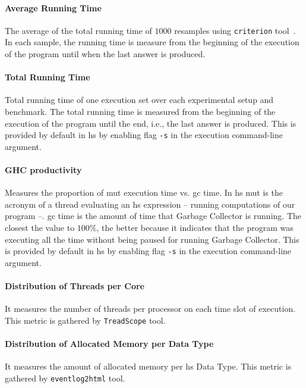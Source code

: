 \paragraph{Average Running Time} The average of the total running time of $1000$ resamples using \texttt{criterion} tool~\cite{criterion}. 
In each sample, the running time is measure from the beginning of the execution of the program until when the last answer is produced.

\paragraph{Total Running Time} Total running time of one execution set over each experimental setup and benchmark. 
The total running time is measured from the beginning of the execution of the program until the end, i.e., the last answer is produced.
This is provided by default in \acrshort{hs} by enabling flag \texttt{-s} in the execution command-line argument.

\paragraph{GHC productivity} Measures the proportion of \acrfull{mut} execution time vs. \acrfull{gc} time. 
In \acrlong{hs} \acrlong{mut} is the acronym of a thread evaluating an \acrshort{hs} expression -- running computations of our program --. 
\acrshort{gc} time is the amount of time that Garbage Collector is running. 
The closest the value to $100\%$, the better because it indicates that the program was executing all the time without being paused for running Garbage Collector. 
This is provided by default in \acrshort{hs} by enabling flag \texttt{-s} in the execution command-line argument.

\paragraph{Distribution of Threads per Core} It measures the number of threads per processor on each time slot of execution.
This metric is gathered by \texttt{TreadScope} \cite{threadscope} tool.

\paragraph{Distribution of Allocated Memory per Data Type} It measures the amount of allocated memory per \acrshort{hs} Data Type. 
This metric is gathered by \texttt{eventlog2html} \cite{eventlog2html} tool.
    
